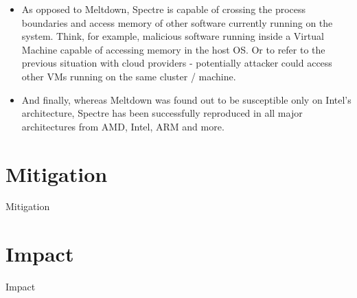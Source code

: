 \documentclass{article}
\begin{document}
\begin{itemize}
  \item As opposed to Meltdown, Spectre is capable of crossing the process boundaries and access memory of other software currently running on the system. Think, for example, malicious software running inside a Virtual Machine capable of accessing memory in the host OS. Or to refer to the previous situation with cloud providers - potentially attacker could access other VMs running on the same cluster / machine.
  \item And finally, whereas Meltdown was found out to be susceptible only on Intel's architecture, Spectre has been successfully reproduced in all major architectures from AMD, Intel, ARM and more. 
\end{itemize}

\section{Mitigation}
Mitigation

\section{Impact}
Impact



 
\end{document}
